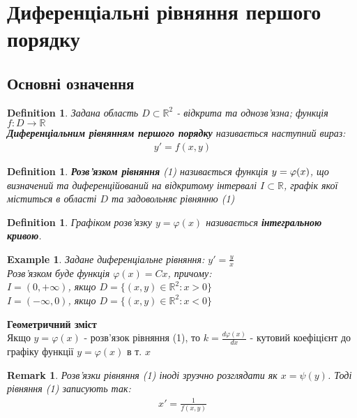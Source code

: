 \documentclass[a4paper, 10pt]{article}
\theoremstyle{theoremdd}
\theoremstyle{theoremdd}
\newtheorem{definition}[theorem]{Definition}
\theoremstyle{theoremdd}
\theoremstyle{theoremdd}
\newtheorem{example}[theorem]{Example}
\theoremstyle{theoremdd}
\theoremstyle{theoremdd}
\newtheorem{remark}[theorem]{Remark}
\theoremstyle{theoremdd}
\theoremstyle{theoremdd}
\begin{document}
\tableofcontents
\newpage
    	
	\section{Диференціальні рівняння першого порядку}
	\subsection{Основні означення}
	\begin{definition}
 Задана область $D \subset \mathbb{R}^2$ - відкрита та однозв'язна; функція $f: D \rightarrow \mathbb{R}$\\
	\textbf{Диференціальним рівнянням першого порядку} називається наступний вираз:
	\begin{align}
	y' = f(x,y)
	\end{align}
	\end{definition}

	\begin{definition}
 \textbf{Розв'язком рівняння} (1) називається функція $\\ y= \varphi(x)$, що визначений та диференційований на відкритому інтервалі $I \subset \mathbb{R}$, графік якої міститься в області $D$ та задовольняє рівнянню (1)
 	\end{definition}
 	
	\begin{definition}
 Графіком розв'язку $y = \varphi(x)$ називається \textbf{інтегральною кривою}.
	\end{definition}
	
	\begin{example}
 Задане диференціальне рівняння: $\displaystyle y' = \frac{y}{x}$\\
	Розв'язком буде функція $\varphi(x)=Cx$, причому:\\
	$I=(0, +\infty)$, якщо $D=\{(x,y) \in \mathbb{R}^2: x>0\}$\\
	$I=(-\infty, 0)$, якщо $D=\{(x,y) \in \mathbb{R}^2: x<0\}$
	\end{example}
	
	\textbf{Геометричний зміст}\\
	Якщо $y=\varphi(x)$ - розв'язок рівняння (1), то $\displaystyle k = \frac{d\varphi(x)}{dx}$ - кутовий коефіцієнт до графіку функції $y=\varphi(x)$ в т. $x$
	
	\begin{remark}
 Розв'язки рівняння (1) іноді зрузчно розглядати як $x=\psi(y)$. Тоді рівняння (1) записують так:
	\begin{align*}
	x'=\frac{1}{f(x,y)}
	\end{align*}
	\end{remark}
	
\end{document}
